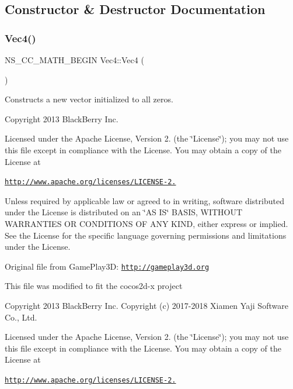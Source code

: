 \subsection{Constructor \& Destructor Documentation}
\mbox{\label{classVec4_a33074e443f66804abe8be3b3e98745bd}} 
\subsubsection{\texorpdfstring{Vec4()}{Vec4()}\hspace{0.1cm}{\footnotesize\ttfamily [1/10]}}
{\footnotesize\ttfamily N\+S\+\_\+\+C\+C\+\_\+\+M\+A\+T\+H\+\_\+\+B\+E\+G\+IN Vec4\+::\+Vec4 (\begin{DoxyParamCaption}{ }\end{DoxyParamCaption})}

Constructs a new vector initialized to all zeros.

Copyright 2013 Black\+Berry Inc.

Licensed under the Apache License, Version 2. (the \char`\"{}\+License\char`\"{}); you may not use this file except in compliance with the License. You may obtain a copy of the License at

\href{http://www.apache.org/licenses/LICENSE-2.0}{\tt http\+://www.\+apache.\+org/licenses/\+L\+I\+C\+E\+N\+S\+E-\/2.}

Unless required by applicable law or agreed to in writing, software distributed under the License is distributed on an \char`\"{}\+A\+S I\+S\char`\"{} B\+A\+S\+IS, W\+I\+T\+H\+O\+UT W\+A\+R\+R\+A\+N\+T\+I\+ES OR C\+O\+N\+D\+I\+T\+I\+O\+NS OF A\+NY K\+I\+ND, either express or implied. See the License for the specific language governing permissions and limitations under the License.

Original file from Game\+Play3D\+: \href{http://gameplay3d.org}{\tt http\+://gameplay3d.\+org}

This file was modified to fit the cocos2d-\/x project

Copyright 2013 Black\+Berry Inc. Copyright (c) 2017-\/2018 Xiamen Yaji Software Co., Ltd.

Licensed under the Apache License, Version 2. (the \char`\"{}\+License\char`\"{}); you may not use this file except in compliance with the License. You may obtain a copy of the License at

\href{http://www.apache.org/licenses/LICENSE-2.0}{\tt http\+://www.\+apache.\+org/licenses/\+L\+I\+C\+E\+N\+S\+E-\/2.}


